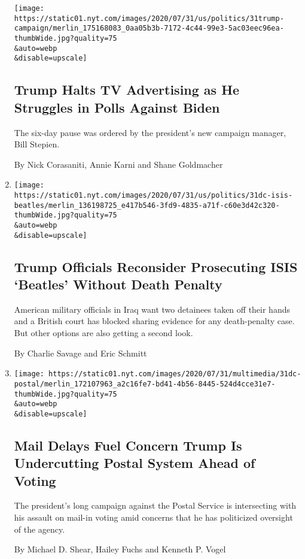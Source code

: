 \begin{enumerate}
  \texttt{[image: https://static01.nyt.com/images/2020/07/31/us/politics/31trump-campaign/merlin\_175168083\_0aa05b3b-7172-4c44-99e3-5ac03eec96ea-thumbWide.jpg?quality=75\\\&auto=webp\\\&disable=upscale]}

  \hypertarget{trump-halts-tv-advertising-as-he-struggles-in-polls-against-biden}{%
  \subsection{Trump Halts TV Advertising as He Struggles in Polls
  Against
  Biden}\label{trump-halts-tv-advertising-as-he-struggles-in-polls-against-biden}}

  The six-day pause was ordered by the president's new campaign manager,
  Bill Stepien.

  By Nick Corasaniti, Annie Karni and Shane Goldmacher
\item
  \href{/2020/07/31/world/middleeast/isis-beatles-hostages.html}{}

  \texttt{[image: https://static01.nyt.com/images/2020/07/31/us/politics/31dc-isis-beatles/merlin\_136198725\_e417b546-3fd9-4835-a71f-c60e3d42c320-thumbWide.jpg?quality=75\\\&auto=webp\\\&disable=upscale]}

  \hypertarget{trump-officials-reconsider-prosecuting-isis-beatles-without-death-penalty}{%
  \subsection{Trump Officials Reconsider Prosecuting ISIS `Beatles'
  Without Death
  Penalty}\label{trump-officials-reconsider-prosecuting-isis-beatles-without-death-penalty}}

  American military officials in Iraq want two detainees taken off their
  hands and a British court has blocked sharing evidence for any
  death-penalty case. But other options are also getting a second look.

  By Charlie Savage and Eric Schmitt
\item
  \href{/2020/07/31/us/politics/trump-usps-mail-delays.html}{}

  \texttt{[image: https://static01.nyt.com/images/2020/07/31/multimedia/31dc-postal/merlin\_172107963\_a2c16fe7-bd41-4b56-8445-524d4cce31e7-thumbWide.jpg?quality=75\\\&auto=webp\\\&disable=upscale]}

  \hypertarget{mail-delays-fuel-concern-trump-is-undercutting-postal-system-ahead-of-voting}{%
  \subsection{Mail Delays Fuel Concern Trump Is Undercutting Postal
  System Ahead of
  Voting}\label{mail-delays-fuel-concern-trump-is-undercutting-postal-system-ahead-of-voting}}

  The president's long campaign against the Postal Service is
  intersecting with his assault on mail-in voting amid concerns that he
  has politicized oversight of the agency.

  By Michael D. Shear, Hailey Fuchs and Kenneth P. Vogel
\end{enumerate}

